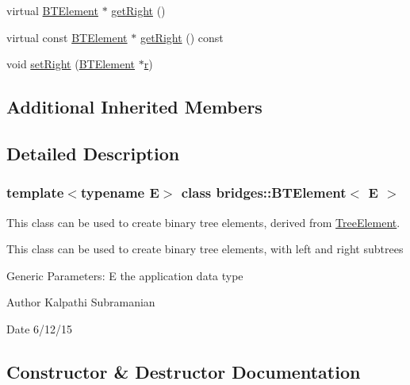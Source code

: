 \begin{DoxyCompactItemize}
virtual \mbox{\hyperlink{classbridges_1_1_b_t_element}{B\+T\+Element}} $\ast$ \mbox{\hyperlink{classbridges_1_1_b_t_element_a931de8a71c04479a4aa0885ecee2a855}{get\+Right}} ()
\item 
virtual const \mbox{\hyperlink{classbridges_1_1_b_t_element}{B\+T\+Element}} $\ast$ \mbox{\hyperlink{classbridges_1_1_b_t_element_ad3b12cd9fa6f3f18fb66c07dbc73a409}{get\+Right}} () const
\item 
void \mbox{\hyperlink{classbridges_1_1_b_t_element_a19cf1ad19b8dd33e0539d77ed7f5c7f6}{set\+Right}} (\mbox{\hyperlink{classbridges_1_1_b_t_element}{B\+T\+Element}} $\ast$\mbox{\hyperlink{namespacebridges_acfb0a4f7877d8f63de3e6862004c50eda4b43b0aee35624cd95b910189b3dc231}{r}})
\end{DoxyCompactItemize}
\subsection*{Additional Inherited Members}


\subsection{Detailed Description}
\subsubsection*{template$<$typename E$>$\newline
class bridges\+::\+B\+T\+Element$<$ E $>$}

This class can be used to create binary tree elements, derived from \mbox{\hyperlink{classbridges_1_1_tree_element}{Tree\+Element}}. 

This class can be used to create binary tree elements, with left and right subtrees

Generic Parameters\+: E the application data type

\begin{DoxyAuthor}{Author}
Kalpathi Subramanian 
\end{DoxyAuthor}
\begin{DoxyDate}{Date}
6/12/15 
\end{DoxyDate}


\subsection{Constructor \& Destructor Documentation}
\mbox{\label{classbridges_1_1_b_t_element_a8abf38e5d2d70c247de6a6fe6b90bf1b}} 
